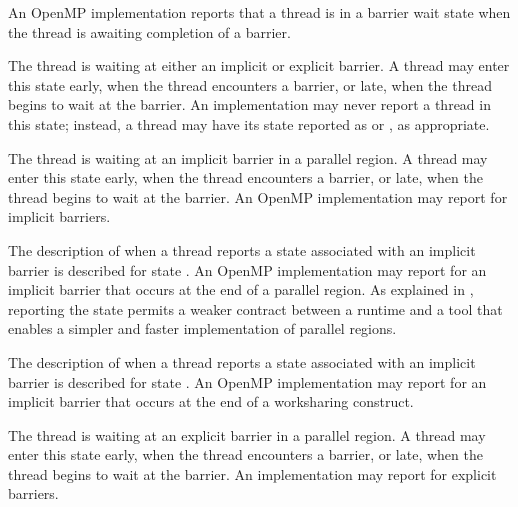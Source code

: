 
An OpenMP implementation reports that a thread is in a barrier wait state 
when the thread is awaiting completion of a barrier.


\begin{description}

  \item {} 
  
  \sloppy
  The thread is waiting at either an implicit or explicit barrier.
  A thread may enter this state
  early, when the thread encounters a barrier, or late, when the
  thread begins to wait at the barrier. An implementation may never report a thread in this state; instead, a thread may have its state reported
  as   or , as appropriate.
  
  \item {} 
  
  \sloppy
  The thread is waiting at an implicit barrier in a parallel region. 
  A  thread may enter this state
  early, when the thread encounters a barrier, or late, when the
  thread begins to wait at the barrier.
  An OpenMP implementation may report  
  for implicit barriers.
  
  \item {} 

  The description of when a thread reports a state associated with an implicit barrier
  is described for state .  
  An OpenMP implementation may report  
  for an implicit barrier that occurs at the end of a parallel region. 
  As explained in ,
  reporting the state  
  permits a weaker contract between a runtime and a tool that 
  enables a simpler and faster implementation of parallel regions.

  \item {} 

  The description of when a thread reports a state associated with an implicit barrier
  is described for state .  
  An OpenMP implementation may report  
  for an implicit barrier that occurs at the end of a worksharing construct.

  \item {} 

  The thread is waiting at an explicit barrier  in a parallel region. 
  A thread may enter this state
  early, when the thread encounters a barrier, or late, when the
  thread begins to wait at the barrier.
  An implementation may report  
  for explicit barriers.

  
\end{description}
  
